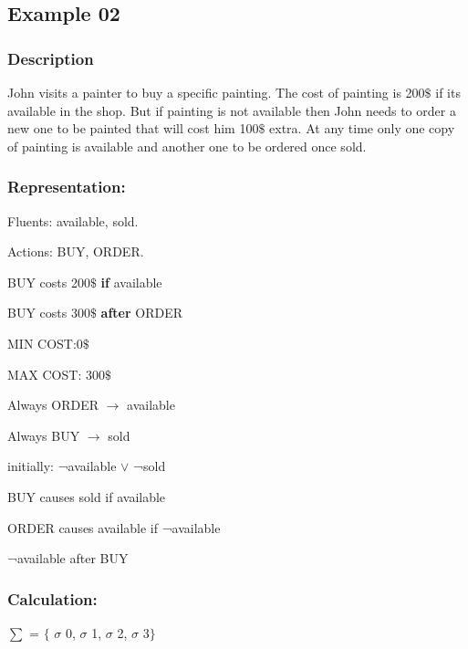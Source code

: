 \documentclass[11pt]{article}
\begin{document}
\subsection{Example 02}\label{example:ex02}
\subsubsection{Description}\label{par:p102}
John visits a painter to buy a specific painting. The cost of painting is 200$\$$  if its available in the shop. But if painting is not available then John needs to order a new one to be painted that will cost him 100$\$$  extra. At any time only one copy of painting is available and another one to be ordered once sold.\pagebreak

\subsubsection{Representation:}\label{par:p202}
\indent 
\par Fluents: available, sold.\par
Actions: BUY, ORDER.\par
BUY costs 200$\$$  \textbf{if} available\par

BUY costs 300$\$$  \textbf{after} ORDER\par


MIN COST:0$\$$ \par

MAX COST: 300$\$$ \par


Always ORDER $\rightarrow$ available\par

Always BUY $\rightarrow$ sold\par

initially: ¬available $\vee$  ¬sold\par

BUY causes sold if available\par

ORDER causes available if ¬available\par

¬available after BUY\\

\subsubsection{Calculation:}\label{par:p302}
\indent \par
$ \sum $ = $ \{ $ $ \sigma $ 0, $ \sigma $ 1, $ \sigma $ 2, $ \sigma $ 3$ \} $ \par
\end{document}
